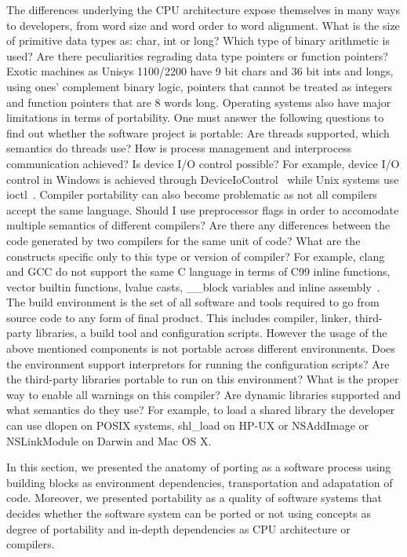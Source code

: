 \documentclass[12pt,a4paper]{report}
\begin{document}
The differences underlying the CPU architecture expose themselves in many ways to developers, from
word size and word order to word alignment. What is the size of primitive data types as: char, int
or long? Which type of binary arithmetic is used? Are there peculiarities regrading data type
pointers or function pointers? Exotic machines as Unisys 1100/2200 have 9 bit chars
and 36 bit ints and longs, using ones' complement binary logic, pointers that cannot be treated
as integers and function pointers that are 8 words long.
Operating systems also have major limitations
in terms of portability. One must answer the following questions to
find out whether the software project is portable: Are threads supported, which semantics do threads
use? How is process management and interprocess communication achieved? Is device I/O control
possible? For example, device I/O control in Windows is achieved through DeviceIoControl~\cite{grantmestrength}
while Unix systems use ioctl~\cite{ioctl_linux, ioctl_openbsd, ioctl_freebsd}.
Compiler portability can also become problematic as not all compilers accept the same language.
Should I use preprocessor
flags in order to accomodate multiple semantics of different compilers? Are there any differences
between the code generated by two compilers for the same unit of code?
What are the constructs specific only to this type or version of compiler? For example, clang and GCC
do not support the same C language in terms of C99 inline functions, vector builtin functions,
lvalue casts, \_\_block variables and inline assembly~\cite{language_compatibility}.
The build environment is the set of all software and tools required to go from source code to any
form of final product. This includes compiler, linker, third-party libraries, a build tool and
configuration scripts. However the usage of the above mentioned components is not portable across
different environments. Does the environment support interpretors for running the configuration
scripts? Are the third-party libraries portable to run on this environment? What is the proper way
to enable all warnings on this compiler? Are dynamic libraries supported and what semantics do they use?
For example, to load a shared library the developer can use dlopen on POSIX systems, shl\_load on
HP-UX or NSAddImage or NSLinkModule on Darwin and Mac OS X.

In this section, we presented the anatomy of porting as a software process using building blocks
as environment dependencies, transportation and adapatation of code. Moreover, we presented
portability as a quality of software systems that decides whether the software system can be
ported or not using concepts as degree of portability and in-depth dependencies as CPU architecture
or compilers.
\end{document}
